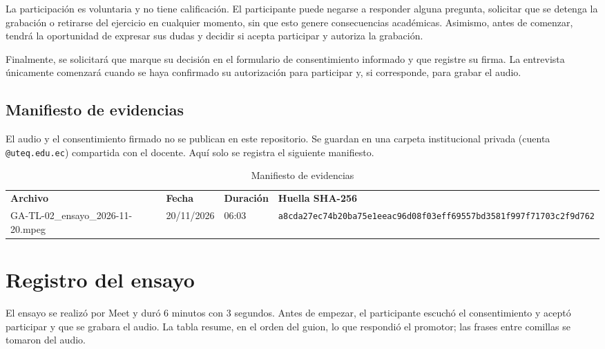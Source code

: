 \documentclass[12pt,a4paper]{article}
\begin{document}
La participación es voluntaria y no tiene calificación. El participante puede negarse a responder alguna pregunta, solicitar que se detenga la grabación o retirarse del ejercicio en cualquier momento, sin que esto genere consecuencias académicas. Asimismo, antes de comenzar, tendrá la oportunidad de expresar sus dudas y decidir si acepta participar y autoriza la grabación.

Finalmente, se solicitará que marque su decisión en el formulario de consentimiento informado y que registre su firma. La entrevista únicamente comenzará cuando se haya confirmado su autorización para participar y, si corresponde, para grabar el audio.


\subsection{Manifiesto de evidencias}

El audio y el consentimiento firmado no se publican en este repositorio.
Se guardan en una carpeta institucional privada (cuenta \texttt{@uteq.edu.ec})
compartida con el docente. Aquí solo se registra el siguiente manifiesto.

\begin{table}[H]
\centering
\small
\begin{tabularx}{\textwidth}{>{\raggedright\arraybackslash}p{3.2cm} p{2.4cm} p{2.0cm} Y}
\textbf{Archivo} & \textbf{Fecha} & \textbf{Duración} & \textbf{Huella SHA-256} \\
GA-TL-02\_ensayo\_2026-11-20.mpeg & 20/11/2026 & 06:03 & \texttt{\scriptsize a8cda27ec74b20ba75e1eeac96d08f03\allowbreak eff69557bd3581f997f71703c2f9d762} \\
\end{tabularx}
\caption{Manifiesto de evidencias}
\end{table}

\section{Registro del ensayo}

El ensayo se realizó por Meet y duró 6 minutos con 3 segundos. Antes de empezar, el participante escuchó el consentimiento y aceptó participar y que se grabara el audio. La tabla resume, en el orden del guion, lo que respondió el promotor; las frases entre comillas se tomaron del audio.
\end{document}
